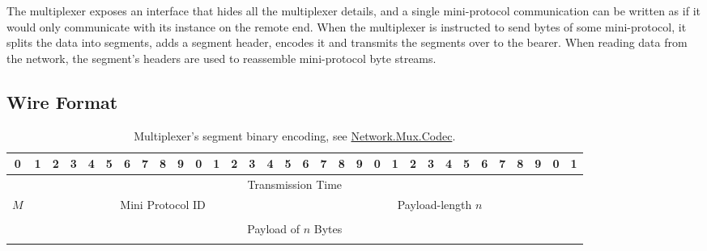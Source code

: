 The multiplexer exposes an interface that hides all the multiplexer details,
and a single mini-protocol communication can be written as if it would only
communicate with its instance on the remote end.  When the multiplexer is
instructed to send bytes of some mini-protocol, it splits the data into
segments, adds a segment header, encodes it and transmits the segments over to the
bearer.  When reading data from the network, the segment's headers are used
to reassemble mini-protocol byte streams.

\subsection{Wire Format}
\label{section:wire-format}

\begin{table}
  \begin{center}
    \begingroup
    \setlength{\tabcolsep}{3pt}
    \begin{tabular}{|c|c|c|c|c|c|c|c|c|c|c|c|c|c|c|c|c|c|c|c|c|c|c|c|c|c|c|c|c|c|c|c|}
      \hline
      0&1&2&3&4&5&6&7&8&9&0&1&2&3&4&5&6&7&8&9&0&1&2&3&4&5&6&7&8&9&0&1 \\ \hline
      \multicolumn{32}{|c|}{Transmission Time} \\ \hline
      \multicolumn{1}{|c|}{$M$}
      &\multicolumn{15}{|c|}{Mini Protocol ID}
      &\multicolumn{16}{|c|}{Payload-length $n$} \\ \hline
      \multicolumn{32}{|c|}{} \\
      \multicolumn{32}{|c|}{Payload of $n$ Bytes} \\
      \multicolumn{32}{|c|}{} \\ \hline
    \end{tabular}
    \endgroup
    \caption{Multiplexer's segment binary encoding, see
    \href{https://ouroboros-network.cardano.intersectmbo.org/network-mux/Network-Mux-Codec}{Network.Mux.Codec}.}
    \label{segment-header}
  \end{center}
\end{table}

